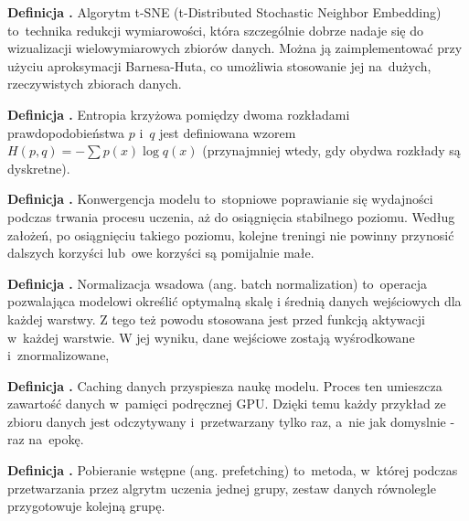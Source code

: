 \noindent
\textbf{Definicja .}
\incrementdefinitionIndex
Algorytm t-SNE (t-Distributed Stochastic Neighbor Embedding) to~technika redukcji wymiarowości,
która szczególnie dobrze nadaje się do wizualizacji wielowymiarowych zbiorów danych.
Można ją zaimplementować przy użyciu aproksymacji Barnesa-Huta,
co umożliwia stosowanie jej na~dużych, rzeczywistych zbiorach danych.

\noindent
\textbf{Definicja .}
\incrementdefinitionIndex
Entropia krzyżowa pomiędzy dwoma rozkładami prawdopodobieństwa $p$ i~$q$ jest definiowana wzorem
$H(p,q) = -\sum p(x) \log q(x) $ (przynajmniej wtedy, gdy obydwa rozkłady są dyskretne).

\noindent
\textbf{Definicja .}
\incrementdefinitionIndex
Konwergencja modelu to~stopniowe poprawianie się wydajności podczas trwania procesu uczenia,
aż do osiągnięcia stabilnego poziomu. Według założeń, po osiągnięciu takiego poziomu,
kolejne treningi nie powinny przynosić dalszych korzyści lub~owe korzyści są pomijalnie małe.

\noindent
\textbf{Definicja .}
\incrementdefinitionIndex
Normalizacja wsadowa (ang. batch normalization) to~operacja pozwalająca modelowi określić optymalną skalę
i średnią danych wejściowych dla każdej warstwy.
Z tego też powodu stosowana jest przed funkcją aktywacji w~każdej warstwie.
W jej wyniku, dane wejściowe zostają wyśrodkowane i~znormalizowane,

\noindent
\textbf{Definicja .}
\incrementdefinitionIndex
Caching danych przyspiesza naukę modelu. Proces ten umieszcza zawartość danych w~pamięci podręcznej GPU.
Dzięki temu każdy przykład ze zbioru danych jest odczytywany i~przetwarzany tylko raz, a~nie jak domyslnie - raz na~epokę.

\noindent
\textbf{Definicja .}
\incrementdefinitionIndex
Pobieranie wstępne (ang. prefetching) to~metoda, w~której podczas przetwarzania przez algrytm uczenia jednej grupy,
zestaw danych równolegle przygotowuje kolejną grupę.